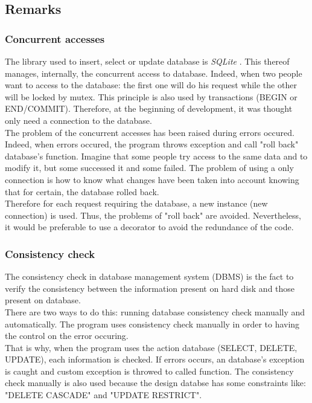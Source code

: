 \subsection{Remarks}
\subsubsection{Concurrent accesses}
\setlength{\parindent}{1cm}
\hspace{1cm}
The library used to insert, select or update database is
\emph{SQLite} \cite{SQLite}. This thereof manages, internally,
the concurrent access to database. Indeed, when two people want to
access to the database: the first one will do his request while
the other will be locked by mutex. This principle is also used by transactions
(BEGIN or END/COMMIT).
Therefore, at the beginning of development, it was thought only need a
connection to the database.\\
The problem of the concurrent accesses has been raised during errors occured.
Indeed, when errors occured, the program throws exception and call "roll back"
database's function. Imagine that some people try access to the same data and to
modify it, but some successed it and some failed. The problem of using a only
connection is how to know what changes have been taken into account knowing
that for certain, the database rolled back.\\
Therefore for each request requiring the database,
a new instance (new connection) is used. Thus, the problems
of "roll back" are avoided. Nevertheless, it would be preferable to use a decorator
to avoid the redundance of the code.

\subsubsection{Consistency check}

The consistency check in database management system (DBMS) is the fact
to verify the consistency between the information present on hard disk and
those present on database.\\
There are two ways to do this: running database consistency check manually and
automatically. The program uses consistency check manually in order to
having the control on the error occuring.\\
That is why, when the program uses the action database (SELECT, DELETE, UPDATE),
each information is checked. If errors occurs, an database's exception is caught
and custom exception is throwed to called function.
The consistency check manually is also used because the design databse
has some constraints like: "DELETE CASCADE" and "UPDATE RESTRICT".

